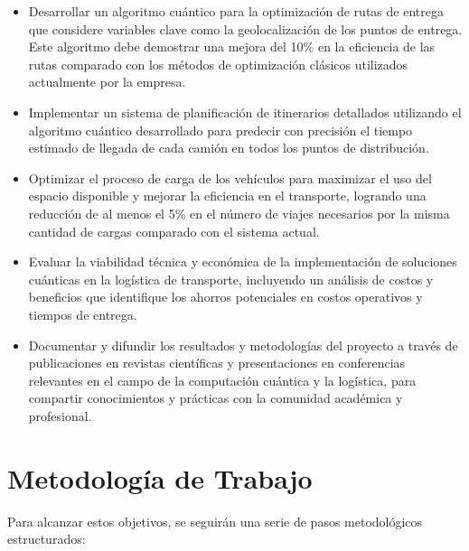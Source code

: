 \documentclass[11pt,a4paper,spanish]{book}
\begin{document}
    \begin{itemize}
        \item Desarrollar un algoritmo cuántico para la optimización de rutas de entrega que considere variables clave como la geolocalización de los puntos de entrega. Este algoritmo debe demostrar una mejora del 10\% en la eficiencia de las rutas comparado con los métodos de optimización clásicos utilizados actualmente por la empresa.

        \item Implementar un sistema de planificación de itinerarios detallados utilizando el algoritmo cuántico desarrollado para predecir con precisión el tiempo estimado de llegada de cada camión en todos los puntos de distribución.

        \item Optimizar el proceso de carga de los vehículos para maximizar el uso del espacio disponible y mejorar la eficiencia en el transporte, logrando una reducción de al menos el 5\% en el número de viajes necesarios por la misma cantidad de cargas comparado con el sistema actual.

        \item Evaluar la viabilidad técnica y económica de la implementación de soluciones cuánticas en la logística de transporte, incluyendo un análisis de costos y beneficios que identifique los ahorros potenciales en costos operativos y tiempos de entrega.

        \item Documentar y difundir los resultados y metodologías del proyecto a través de publicaciones en revistas científicas y presentaciones en conferencias relevantes en el campo de la computación cuántica y la logística, para compartir conocimientos y prácticas con la comunidad académica y profesional.

    \end{itemize}

    \section{Metodología de Trabajo}

    Para alcanzar estos objetivos, se seguirán una serie de pasos metodológicos estructurados:
\end{document}
